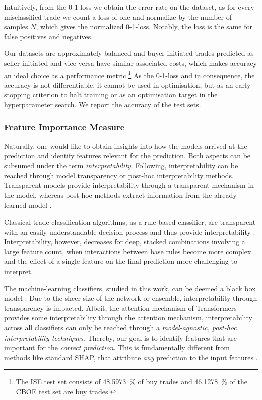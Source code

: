 Intuitively, from the 0-1-loss we obtain the error rate on the dataset, as for every misclassified trade we count a loss of one and normalize by the number of samples $N$, which gives the normalized 0-1-loss. Notably, the loss is the same for false positives and negatives.

Our datasets are approximately balanced and buyer-initiated trades predicted as seller-initiated and vice versa have similar associated costs, which makes accuracy an ideal choice as a performance metric.\footnote{The \gls{ISE} test set consists of \SI{48.5973}{\percent} of buy trades and \SI{46.1278}{\percent} of the \gls{CBOE} test set are buy trades.} As the 0-1-loss and in consequence, the accuracy is not differentiable, it cannot be used in optimisation, but as an early stopping criterion to halt training or as an optimisation target in the hyperparameter search. We report the accuracy of the test sets.

\subsubsection{Feature Importance
    Measure}\label{sec:feature-importance-measure}

Naturally, one would like to obtain insights into how the models arrived at the prediction and identify features relevant for the prediction. Both aspects can be subsumed under the term \emph{interpretability}. Following, \textcite[][4]{liptonMythosModelInterpretability2017} interpretability can be reached through model transparency or post-hoc interpretability methods. Transparent models provide interpretability through a transparent mechanism in the model, whereas post-hoc methods extract information from the already learned model \autocite[][4--5]{liptonMythosModelInterpretability2017}.

Classical trade classification algorithms, as a rule-based classifier, are transparent with an easily understandable decision process and thus provide interpretability \autocite[][91]{barredoarrietaExplainableArtificialIntelligence2020}. Interpretability, however, decreases for deep, stacked combinations involving a large feature count, when interactions between base rules become more complex and the effect of a single feature on the final prediction more challenging to interpret.

The machine-learning classifiers, studied in this work, can be deemed a black box model \autocite[][90]{barredoarrietaExplainableArtificialIntelligence2020}. Due to the sheer size of the network or ensemble, interpretability through transparency is impacted. Albeit, the attention mechanism of Transformers provides some interpretability through the attention mechanism,  interpretability across all classifiers can only be reached through a \emph{model-agnostic, post-hoc interpretability techniques}. Thereby, our goal is to identify features that are important for the \emph{correct prediction}. This is fundamentally different from methods like standard \gls{SHAP}, that attribute \emph{any} prediction to the input features \autocite[][??]{chenTrueModelTrue2020}.

